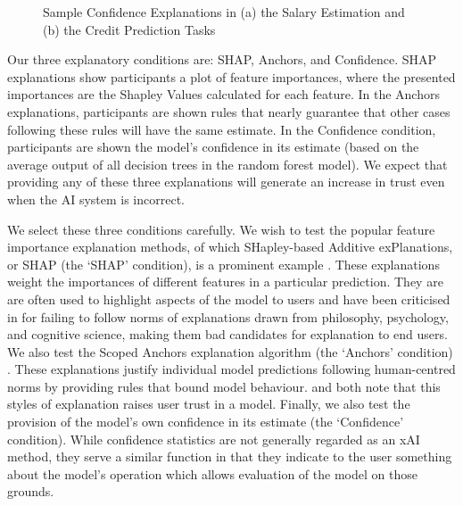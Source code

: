 \begin{figure}[htbp]
    \hspace{\fill}
    \hspace{\fill}
    \hspace{\fill}
    \caption{Sample Confidence Explanations in (a) the Salary Estimation and (b) the Credit Prediction Tasks}
    \label{fig:survey_confidence}
\end{figure}

Our three explanatory conditions are: SHAP, Anchors, and Confidence. SHAP explanations show participants a plot of feature importances, where the presented importances are the Shapley Values calculated for each feature. In the Anchors explanations, participants are shown rules that nearly guarantee that other cases following these rules will have the same estimate. In the Confidence condition, participants are shown the model's confidence in its estimate (based on the average output of all decision trees in the random forest model). We expect that providing any of these three explanations will generate an increase in trust even when the AI system is incorrect.

We select these three conditions carefully. We wish to test the popular feature importance explanation methods, of which SHapley-based Additive exPlanations, or SHAP (the `SHAP' condition), is a prominent example \cite{lundberg_unified_2017}. These explanations weight the importances of different features in a particular prediction. They are are often used to highlight aspects of the model to users and have been criticised in \textcite{kumar_problems_2020} for failing to follow norms of explanations drawn from philosophy, psychology, and cognitive science, making them bad candidates for explanation to end users. We also test the Scoped Anchors explanation algorithm (the `Anchors' condition) \cite{ribeiro_anchors_2018}. These explanations justify individual model predictions following human-centred norms by providing rules that bound model behaviour. \textcite{bansal_does_2021} and \textcite{jacobs_how_2021} both note that this styles of explanation raises user trust in a model. Finally, we also test the provision of the model's own confidence in its estimate (the `Confidence' condition). While confidence statistics are not generally regarded as an xAI method, they serve a similar function in that they indicate to the user something about the model's operation which allows evaluation of the model on those grounds.

